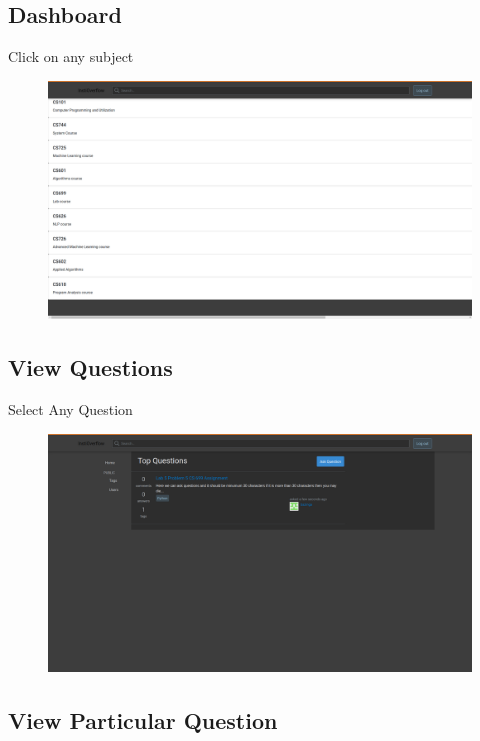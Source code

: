 \documentclass[12pt]{article}
\begin{document}
\subsection{Dashboard}
Click on any subject\\


\begin{figure}[H]
\begin{center}
\includegraphics[width=0.75\columnwidth]{Dashboard}
\end{center}
\end{figure}

\subsection{View Questions}
Select Any Question\\


\begin{figure}[H]
\begin{center}
\includegraphics[width=0.75\columnwidth]{Viewsubject}
\end{center}
\end{figure}

\subsection{View Particular Question}
\end{document}
